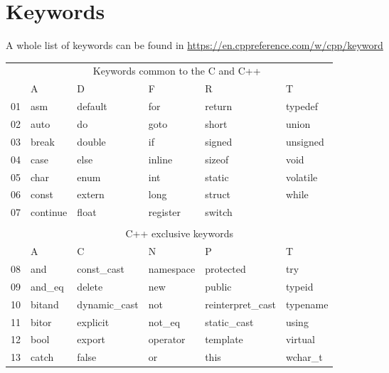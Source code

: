 \section{Keywords}
\label{sec:Keywords}
A whole list of keywords can be found in \url{https://en.cppreference.com/w/cpp/keyword}

\begin{table}[!h]
\centering
\begin{tabular}{|l|l|l|l|l|l|} 
\hhline{~-----|}
\multicolumn{1}{l|}{} & \multicolumn{5}{c|}{{\cellcolor[rgb]{1,0.741,0.267}}Keywords common to the C and C++~} \\ 
\cline{2-6}
\multicolumn{1}{l|}{} & A & D & F & R & T \\ 
\hline
01 & asm & default & for & return & typedef \\
\rowcolor[rgb]{0.753,0.753,0.753} 02 & auto & do & goto & short & union \\
03 & break & double & if & signed & unsigned \\
\rowcolor[rgb]{0.753,0.753,0.753} 04 & case & else & inline & sizeof & void \\
05 & char & enum & int & static & volatile \\
\rowcolor[rgb]{0.753,0.753,0.753} 06 & const & extern & long & struct & while \\
07 & continue & float & register & switch &  \\ 
\hline
\multicolumn{1}{l}{} & \multicolumn{1}{l}{} & \multicolumn{1}{l}{} & \multicolumn{1}{l}{} & \multicolumn{1}{l}{} & \multicolumn{1}{l}{} \\ 
\hhline{~-----|}
\multicolumn{1}{l|}{} & \multicolumn{5}{c|}{{\cellcolor[rgb]{1,0.741,0.267}}C++ exclusive keywords    } \\ 
\cline{2-6}
\multicolumn{1}{l|}{} & A & C & N & P & T \\ 
\hline
\rowcolor[rgb]{0.753,0.753,0.753} 08 & and & const\_cast & namespace & protected & try \\
09 & and\_eq & delete & new & public & typeid \\
\rowcolor[rgb]{0.753,0.753,0.753} 10 & bitand & dynamic\_cast & not & reinterpret\_cast & typename \\
11 & bitor & explicit & not\_eq & static\_cast & using \\
\rowcolor[rgb]{0.753,0.753,0.753} 12 & bool & export & operator & template & virtual \\
13 & catch & false & or & this & wchar\_t \\

\end{tabular}
\end{table}
